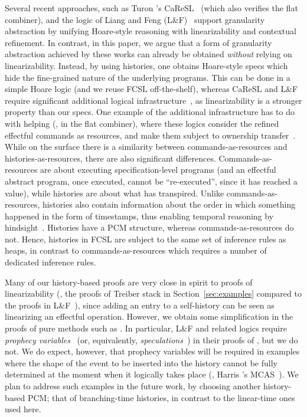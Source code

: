 Several recent approaches, such as Turon \etal's
CaReSL~\cite{Turon-al:ICFP13} (which also verifies the flat combiner),
and the logic of Liang and Feng (L\&F)~\cite{Liang-Feng:PLDI13}
support granularity abstraction by unifying Hoare-style reasoning with
linearizability and contextual refinement. 
%
%
In contrast, in this paper, we argue that a form of granularity
abstraction achieved by these works can already be obtained
\emph{without} relying on linearizability. Instead, by using
histories, one obtains Hoare-style specs which hide the fine-grained
nature of the underlying programs. This can be done in a simple Hoare
logic (and we reuse FCSL off-the-shelf), whereas CaReSL and L\&F
require significant additional logical
infrastructure~\cite{Liang-al:POPL12,Turon-al:POPL13}, as
linearizability is a stronger property than our specs. One example of
the additional infrastructure has to do with helping (\eg, in the flat
combiner), where these logics consider the refined effectful commands
as resources, and make them subject to ownership
transfer~\cite{Turon-al:ICFP13}.
% 
While on the surface there is a similarity between
commands-as-resources and histories-as-resources, there are also
significant differences. Commands-as-resources are about executing
specification-level programs (and an effectful abstract program, once
executed, cannot be ``re-executed'', since it has reached a value),
while histories are about what has transpired. Unlike
commands-as-resources, histories also contain information about the
order in which something happened in the form of timestamps, thus
enabling temporal reasoning by
hindsight~\cite{OHearn-al:PODC10}. Histories have a PCM structure,
whereas commands-as-resources do not. Hence, histories in FCSL are
subject to the same set of inference rules as heaps, in contrast to
commands-as-resources which requires a number of dedicated inference
rules.


Many of our history-based proofs are very close in spirit to proofs of
linearizability (\eg, the proofs of Treiber stack in
Section~\ref{sec:examples} compared to the proofs in
L\&F~\cite{Liang-Feng:PLDI13}), since adding an entry to a self-history
can be seen as linearizing an effectful operation.
%
However, we obtain some simplification in the proofs of pure methods
such as . In particular, L\&F and related logics require
\emph{prophecy variables}~\cite{Qadeer-al:TR09} (or, equivalently,
\emph{speculations}~\cite{Liang-Feng:PLDI13,Turon-al:POPL13}) in their
proofs of , but we do not.
%
We do expect, however, that prophecy variables will be required in
examples where the shape of the event to be inserted into the history
cannot be fully determined at the moment when it logically takes place
(\eg, Harris \etal's MCAS~\cite{Vafeiadis:PhD}). We plan to address
such examples in the future work, by choosing another history-based
PCM; that of branching-time histories, in contrast to the linear-time
ones used here.
 
